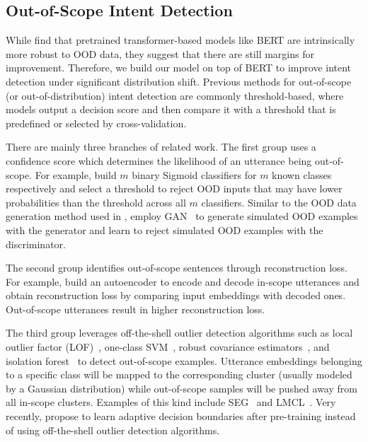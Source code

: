\subsection{Out-of-Scope Intent Detection}
While \citet{DBLP:conf/acl/HendrycksLWDKS20} find that pretrained transformer-based models like BERT are intrinsically more robust to OOD data, they suggest that there are still margins for improvement. Therefore, we build our model on top of BERT to improve intent detection under significant distribution shift. Previous methods for out-of-scope (or out-of-distribution) intent detection are commonly threshold-based, where models output a decision score and then compare it with a threshold that is predefined or selected by cross-validation. 

There are mainly three branches of related work. The first group uses a confidence score which determines the likelihood of an utterance being out-of-scope. 
For example, \citet{DBLP:conf/emnlp/ShuXL17} build $m$ binary Sigmoid classifiers for $m$ known classes respectively and select a threshold to reject OOD inputs that may have lower probabilities than the threshold across all $m$ classifiers. 
Similar to the OOD data generation method used in \citet{lee2017training}, \citet{ryu-etal-2018-domain} employ GAN~\citep{goodfellow2014generative} to generate simulated OOD examples with the generator and learn to reject simulated OOD examples with the discriminator.

The second group identifies out-of-scope sentences through reconstruction loss. For example, \citet{10.1016/j.patrec.2017.01.008} build an autoencoder to encode and decode in-scope utterances and obtain reconstruction loss by comparing input embeddings with decoded ones. Out-of-scope utterances result in higher reconstruction loss. 

The third group leverages off-the-shell outlier detection algorithms such as local outlier factor (LOF)~\citep{10.1145/335191.335388}, one-class SVM~\citep{6790022}, robust covariance estimators~\citep{article}, and isolation forest~\citep{10.1109/ICDM.2008.17} to detect out-of-scope examples. Utterance embeddings belonging to a specific class will be mapped to the corresponding cluster (usually modeled by a Gaussian distribution) while out-of-scope samples will be pushed away from all in-scope clusters. Examples of this kind include SEG~\citep{DBLP:conf/acl/YanFLLZWL20} and LMCL~\citep{DBLP:conf/acl/LinX19}. Very recently, \citet{Zhang_Xu_Lin_2021} propose to learn adaptive decision boundaries after pre-training instead of using off-the-shell outlier detection algorithms.

